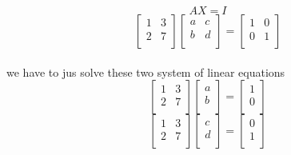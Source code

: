 \documentclass[a4paper,11pt]{article}
\numberwithin{equation}{section}
\begin{document}
\begin{itemize}
        \begin{equation}
            AX=I
        \end{equation}
        \begin{equation}
            \begin{bmatrix}
                1 & 3\\
                2 & 7 \\
            \end{bmatrix}
            \begin{bmatrix}
                a & c\\
                b & d \\
            \end{bmatrix}=
            \begin{bmatrix}
                1 & 0\\
                0 & 1\\
            \end{bmatrix}
        \end{equation}\\
we have to jus solve these two system of linear equations
        \begin{equation}
            \begin{bmatrix}
                1 & 3\\
                2 & 7 \\
            \end{bmatrix}
            \begin{bmatrix}
                a \\
                b  \\
            \end{bmatrix}=
            \begin{bmatrix}
                1 \\
                0 \\
            \end{bmatrix}
        \end{equation}
        \begin{equation}
            \begin{bmatrix}
                1 & 3\\
                2 & 7 \\
            \end{bmatrix}
            \begin{bmatrix}
                c \\
                d  \\
            \end{bmatrix}=
            \begin{bmatrix}
                0 \\
                1 \\
            \end{bmatrix}
        \end{equation}\\


\end{itemize}
\end{document}
